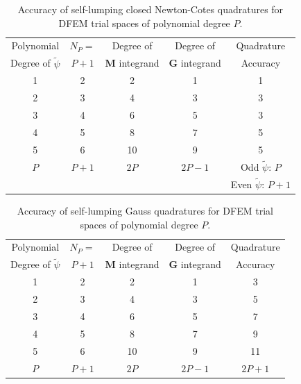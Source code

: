 \begin{table}[!ht]
\centering
\caption{Accuracy of self-lumping closed Newton-Cotes quadratures for DFEM trial spaces of polynomial degree $P$.}
\begin{tabular}{|c|c|c|c|c|} 
\hline
  Polynomial 											& $N_P=$		  & Degree of   					 &  Degree of   					& Quadrature \\
  Degree  of $\widetilde{\psi}$		& $P+1$		 		& $\mathbf{M}$ integrand & $\mathbf{G}$ integrand & Accuracy  \\
	\hline
				1   											&   2   		&   2   								&		1												&				1			\\ 		\hline
				2   											&   3   		&    4  								&			3											&				3			\\		\hline	
				3   											&   4   		&   6   								&			5 										&	3						\\		\hline
				4   											&   5   		&   8   								&			7 										&	5					  \\		\hline
				5   											&   6   		&    10  								&			9											&	5						\\		\hline
				$P$  										 &   $P+1$   &   $2P$   							&	 $2P-1$									  &  Odd $\widetilde{\psi}$: $P$    \\
				{}											&							&											&															& Even $\widetilde{\psi}$: $P+1$  \\ \hline
\end{tabular}
\label{tbl:int_acc_nc} 
\end{table}
\begin{table}[!ht]
\centering
\caption{Accuracy of self-lumping Gauss quadratures for DFEM trial spaces of polynomial degree $P$.}
\begin{tabular}{|c|c|c|c|c|} 
\hline
  Polynomial 											& $N_P=$		  & Degree of   					 &  Degree of   					&  Quadrature  \\
  Degree  of $\widetilde{\psi}$		& $P+1$		 		& $\mathbf{M}$ integrand & $\mathbf{G}$ integrand  &   Accuracy 		 \\ \hline
				1   											&   2   		&   2   								&		1												&				3		\\ 		\hline
				2   											&   3   		&    4  								&			3											&				5		\\		\hline	
				3   											&   4   		&   6   								&			5 										&				7		\\		\hline
				4   											&   5   		&   8   								&			7 									  &				9	  \\		\hline
				5   											&   6   		&    10  								&			9											&				11	\\		\hline
				$P$  										 &   $P+1$   &   $2P$   							&	 $2P-1$									  &   $2P+1$	\\ \hline
\end{tabular}
\label{tbl:int_acc_gauss} 
\end{table}
